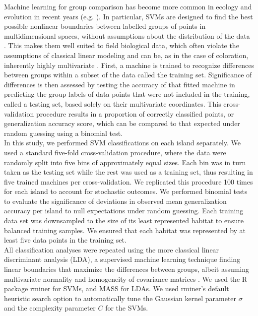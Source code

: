 
Machine learning for group comparison has become more common in ecology and evolution in recent years (e.g. \citealt{Pigot2020}). In particular, SVMs are designed to find the best possible nonlinear boundaries between labelled groups of points in multidimensional spaces, without assumptions about the distribution of the data \citep{Cortes1995, Cristianini2000, Kim2018}. This makes them well suited to field biological data, which often violate the assumptions of classical linear modeling \citep{Kim2018} and can be, as in the case of coloration, inherently highly multivariate \citep{Cuthill1999}. First, a machine is trained to recognize differences between groups within a subset of the data called the training set. Significance of differences is then assessed by testing the accuracy of that fitted machine in predicting the group-labels of data points that were not included in the training, called a testing set, based solely on their multivariate coordinates. This cross-validation procedure results in a proportion of correctly classified points, or generalization accuracy score, which can be compared to that expected under random guessing using a binomial test.\\

In this study, we performed SVM classifications on each island separately. We used a standard five-fold cross-validation procedure, where the data were randomly split into five bins of approximately equal sizes. Each bin was in turn taken as the testing set while the rest was used as a training set, thus resulting in five trained machines per cross-validation. We replicated this procedure 100 times for each island to account for stochastic outcomes. We performed binomial tests to evaluate the significance of deviations in observed mean generalization accuracy per island to null expectations under random guessing. Each training data set was downsampled to the size of its least represented habitat to ensure balanced training samples. We ensured that each habitat was represented by at least five data points in the training set.\\ 

All classification analyses were repeated using the more classical linear discriminant analysis (LDA), a supervised machine learning technique finding linear boundaries that maximize the differences between groups, albeit assuming multivariate normality and homogeneity of covariance matrices \citep{Ripley1996a}. We used the R package rminer \citep{Cortez2010, Cortez2016} for SVMs, and MASS \citep{Venables2002} for LDAs. We used rminer's default heuristic search option to automatically tune the Gaussian kernel parameter $\sigma$ and the complexity parameter $C$ for the SVMs.\\

